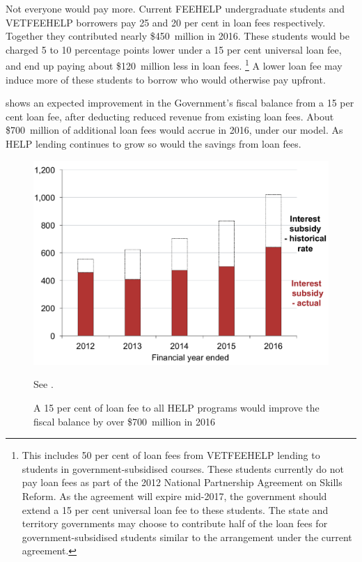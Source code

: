 \documentclass[embargoed]{grattan}
\begin{document}
Not everyone would pay more.
Current \gls{FEEHELP} undergraduate students and \gls{VETFEEHELP} borrowers pay 25 and 20 per cent in loan fees respectively.
Together they contributed nearly \$450~million in 2016.
These students would be charged 5 to 10 percentage points lower under a 15 per cent universal loan fee, and end up paying about \$120~million less in loan fees.%
\footnote{This includes 50 per cent of loan fees from \gls{VETFEEHELP} lending to students in government-subsidised courses.
These students currently do not pay loan fees as part of the 2012 National Partnership Agreement on Skills Reform.
As the agreement will expire mid-2017, the government should extend a 15 per cent universal loan fee to these students.
The state and territory governments may choose to contribute half of the loan fees for government-subsidised students similar to the arrangement under the current agreement.} A lower loan fee may induce more of these students to borrow who would otherwise pay upfront.

 shows an expected improvement in the Government's fiscal balance from a 15 per cent loan fee, after deducting reduced revenue from existing loan fees.
About \$700~million of additional loan fees would accrue in 2016, under our model.
As \gls{HELP} lending continues to grow so would the savings from loan fees.

\begin{figure}
\caption[A 15 per cent of loan fee to all {HELP} programs would improve the fiscal balance by over \$700~million in 2016]{A 15 per cent of loan fee to all \gls{HELP} programs would improve the fiscal balance by over \$700~million in 2016}\label{fig:fig24-a-15pc-loan-fee-all-HELP-progs-would-improve-fisc-bal-by-over-700M-in-2016}


\includegraphics[page=24]{atlas/Chartpack.pdf}

{See .}
\end{figure}
\glsaddall
\printglossaries
\printbibliography
\end{document}
